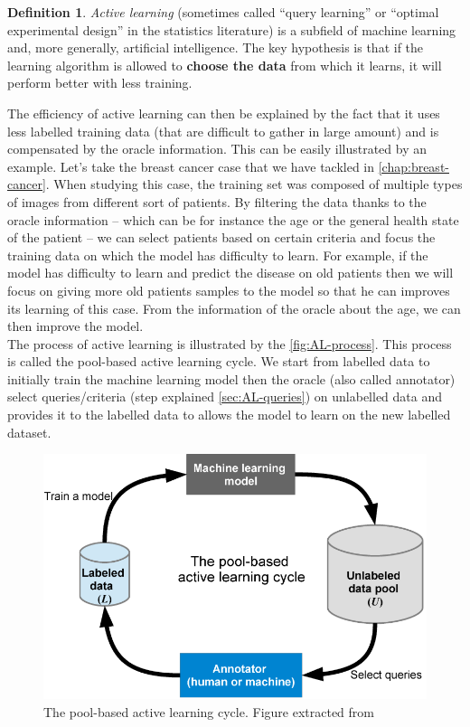 \documentclass[11pt, openany]{report}
\theoremstyle{plain}
\theoremstyle{definition}
\newtheorem{defn}{Definition}[section]
\theoremstyle{remark}
\begin{document}
\begin{defn}
\textit{Active learning} (sometimes called “query learning” or “optimal experimental design” in the statistics literature) is a subfield of machine learning and, more generally, artificial intelligence. The key hypothesis is that if the learning algorithm is allowed to \textbf{choose the data} from which it learns, it will perform better with less training. \cite{AL-Survey}
\end{defn} 

The efficiency of active learning can then be explained by the fact that it uses less labelled training data (that are difficult to gather in large amount) and is compensated by the oracle information. This can be easily illustrated by an example. Let's take the breast cancer case that we have tackled in \autoref{chap:breast-cancer}. When studying this case, the training set was composed of multiple types of images from different sort of patients. By filtering the data thanks to the oracle information -- which can be for instance the age or the general health state of the patient -- we can select patients based on certain criteria and focus the training data on which the model has difficulty to learn. For example, if the model has difficulty to learn and predict the disease on old patients then we will focus on giving more old patients samples to the model so that he can improves its learning of this case. From the information of the oracle about the age, we can then improve the model.   \\

The process of active learning is illustrated by the \autoref{fig:AL-process}. This process is called the pool-based active learning cycle. We start from labelled data to initially train the machine learning model then the oracle (also called annotator) select queries/criteria (step explained \autoref{sec:AL-queries}) on unlabelled data and provides it to the labelled data to allows the model to learn on the new labelled dataset.    

\begin{figure}[H]
  \centering
  \includegraphics[scale=0.45]{figures/AL-process.png}
  \caption{The pool-based active learning cycle. Figure extracted from \cite{AL-figure}}
  \label{fig:AL-process}
\end{figure}
\end{document}

